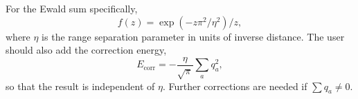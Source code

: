 \documentclass{amsart}
\begin{document}
  For the Ewald sum specifically,
\begin{equation}
f(z) = \exp(-z \pi^2/\eta^2) / z,
\end{equation}
where $\eta$ is the range separation parameter in units of inverse distance.
The user should also add the correction energy,
\begin{equation}
E_\text{corr} = -\frac{\eta}{\sqrt{\pi}} \sum_a q_a^2
,
\end{equation}
so that the result is independent of $\eta$.  Further corrections
are needed if $\sum q_a \ne 0$.
\end{document}
